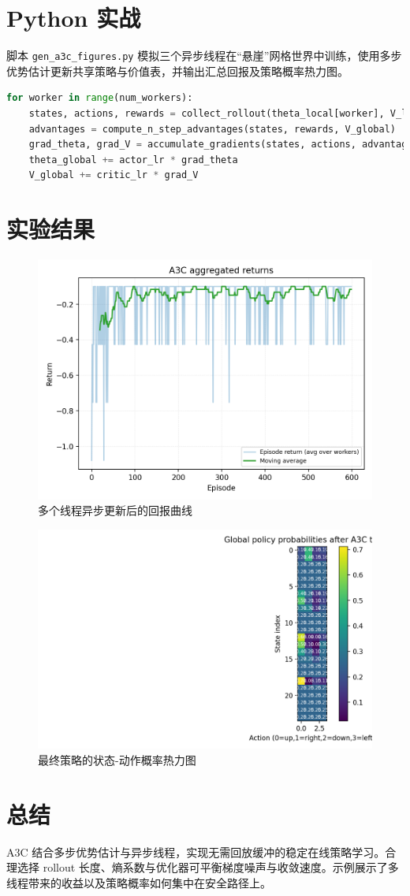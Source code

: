 \documentclass[UTF8,zihao=-4]{ctexart}
\begin{document}
\section{Python 实战}
脚本 \texttt{gen\_a3c\_figures.py} 模拟三个异步线程在“悬崖”网格世界中训练，使用多步优势估计更新共享策略与价值表，并输出汇总回报及策略概率热力图。
\begin{lstlisting}[language=Python,caption={脚本 gen_a3c_figures.py 片段}]
for worker in range(num_workers):
    states, actions, rewards = collect_rollout(theta_local[worker], V_local[worker])
    advantages = compute_n_step_advantages(states, rewards, V_global)
    grad_theta, grad_V = accumulate_gradients(states, actions, advantages)
    theta_global += actor_lr * grad_theta
    V_global += critic_lr * grad_V
\end{lstlisting}

\section{实验结果}
\begin{figure}[H]
  \centering
  \includegraphics[width=0.8\linewidth]{a3c_returns.png}
  \caption{多个线程异步更新后的回报曲线}
  \label{fig:a3c_returns_cn}
\end{figure}

\begin{figure}[H]
  \centering
  \includegraphics[width=0.82\linewidth]{a3c_policy_heatmap.png}
  \caption{最终策略的状态-动作概率热力图}
  \label{fig:a3c_policy_heatmap_cn}
\end{figure}

\FloatBarrier
\section{总结}
A3C 结合多步优势估计与异步线程，实现无需回放缓冲的稳定在线策略学习。合理选择 rollout 长度、熵系数与优化器可平衡梯度噪声与收敛速度。示例展示了多线程带来的收益以及策略概率如何集中在安全路径上。
\end{document}
